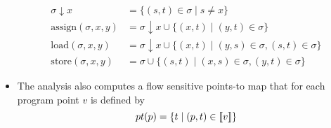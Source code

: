 \begin{itemize}
\begin{align*}
            \sigma \downarrow x &= \{(s,t) \in \sigma \mid s \neq x\} \\
    \text{assign}(\sigma, x, y) &= \sigma \downarrow x \cup \{(x,t) \mid (y,t) \in \sigma \}\\
      \text{load}(\sigma, x, y) &= \sigma \downarrow x \cup \{(x,t) \mid (y,s) \in \sigma, (s,t) \in \sigma \}\\
      \text{store}(\sigma, x, y) &= \sigma \cup \{(s,t) \mid (x,s) \in \sigma, (y,t) \in \sigma \}
  \end{align*}
  \item The analysis also computes a flow sensitive points-to map that for each program point $v$ is defined by
  \begin{equation*}
    pt(p) = \{t \mid (p,t) \in \left\llbracket v\right\rrbracket\}
  \end{equation*}
\end{itemize}
  
\newpage
